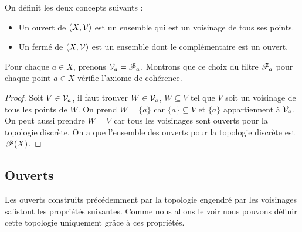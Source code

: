 \begin{definition}
On définit les deux concepts suivants :
\begin{itemize}
    \item Un ouvert de $(X,\mathcal{V})$ est un ensemble qui est un voisinage de tous ses points.
    \item Un fermé de $(X,\mathcal{V})$ est un ensemble dont le complémentaire est un ouvert.
\end{itemize}
\end{definition}

\begin{exemple}
    Pour chaque $a \in X$, prenons $\mathcal{V}_a=\mathscr{F}_a$. Montrons que ce choix du filtre $\mathscr{F}_a$ pour chaque point $a\in X$ vérifie l'axiome de cohérence.
\end{exemple}
\begin{proof}
    Soit $V\in \mathcal{V}_a$, il faut trouver $W\in \mathcal{V}_a$, $W\subseteq V$ tel que $V$ soit un voisinage de tous les points de $W$. On prend $W=\{a\}$ car $\{a\}\subseteq V$ et $\{a\}$ appartiennent à $\mathcal{V}_a$. On peut aussi prendre $W=V$ car tous les voisinages sont ouverts pour la topologie discrète. On a que l'ensemble des ouverts pour la topologie discrète est $\mathscr{P}(X)$.
\end{proof}
\subsection{Ouverts}

Les ouverts construits précédemment par la topologie engendré par les voisinages safistont les propriétés suivantes. Comme nous allons le voir nous pouvons  définir cette topologie uniquement grâce à ces propriétés.

